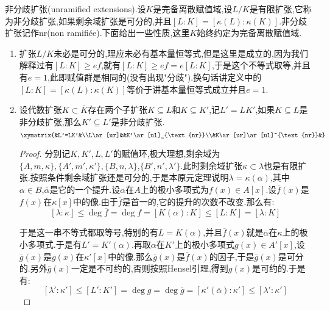 非分歧扩张(unramified extensions).设$K$是完备离散赋值域,设$L/K$是有限扩张,它称为非分歧扩张,如果剩余域扩张是可分的,并且$[L:K]=[\kappa(L):\kappa(K)]$.非分歧扩张记作nr(non ramifi\'ee).下面给出一些性质,这里$K$始终约定为完备离散赋值域.
\begin{enumerate}
	\item 扩张$L/K$未必是可分的,理应未必有基本量恒等式,但是这里是成立的,因为我们解释过有$[L:K]\ge ef$,就有$[L:K]\ge ef=e[L:K]$,于是这个不等式取等,并且有$e=1$,此即赋值群是相同的(没有出现"分歧").换句话讲定义中的$[L:K]=[\kappa(L):\kappa(K)]$等价于讲基本量恒等式成立并且$e=1$.
	\item 设代数扩张$K\subset\overline{K}$存在两个子扩张$K\subseteq L$和$K\subseteq K'$,记$L'=LK'$,如果$K\subseteq L$是非分歧扩张,那么$K'\subseteq L'$是非分歧扩张.
	$$\xymatrix{&L'=LK'&\\L\ar[ur]&&K'\ar[ul]_{\text{nr}}\\&K\ar[ur]\ar[ul]^{\text{nr}}&}$$
	\begin{proof}
		
		分别记$K,K',L,L'$的赋值环,极大理想,剩余域为$\{A,m,\kappa\},\{A',m',\kappa'\},\{B,n,\lambda\}$,$\{B',n',\lambda'\}$.此时剩余域扩张$\kappa\subset\lambda$也是有限扩张.按照条件剩余域扩张还是可分的,于是本原元定理说明$\lambda=\kappa(\overline{\alpha})$,其中$\alpha\in B$,$\overline{\alpha}$是它的一个提升.设$\alpha$在$A$上的极小多项式为$f(x)\in A[x]$.设$\overline{f}(x)$是$f(x)$在$\kappa[x]$中的像.由于$\overline{f}$是首一的,它的提升的次数不改变.那么有:
		$$[\lambda:\kappa]\le\deg\overline{f}=\deg f=[K(\alpha):K]\le[L:K]=[\lambda:K]$$
		
		于是这一串不等式都取等号,特别的有$L=K(\alpha)$,并且$\overline{f}(x)$就是$\overline{\alpha}$在$\kappa$上的极小多项式.于是有$L'=K'(\alpha)$.再取$\alpha$在$K'$上的极小多项式$g(x)\in A'[x]$,设$\overline{g}(x)$是$g(x)$在$\kappa'[x]$中的像.那么$\overline{g}(x)$是$\overline{f}(x)$的因子,于是$\overline{g}(x)$是可分的.另外$\overline{g}(x)$一定是不可约的,否则按照Hensel引理,得到$g(x)$是可约的.于是有:
		$$[\lambda':\kappa']\le[L':K']=\deg g=\deg\overline{g}=[\kappa'(\overline{\alpha}):\kappa']\le[\lambda':\kappa']$$
		

\end{proof}
\end{enumerate}
